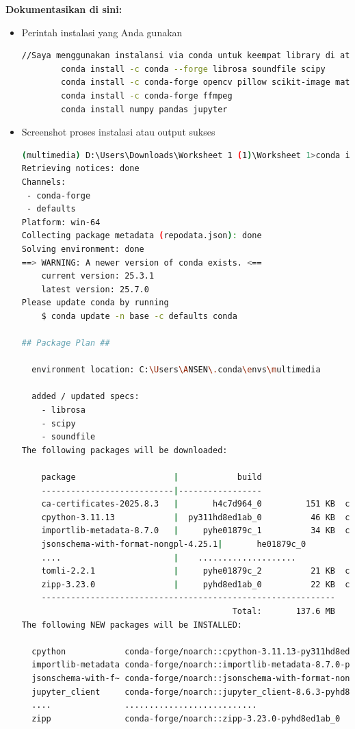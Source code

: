 \documentclass[11pt,a4paper]{article}
\begin{document}
\textbf{Dokumentasikan di sini:}
\begin{itemize}
    \item Perintah instalasi yang Anda gunakan
    \begin{lstlisting}[language=bash, caption=Instalasi library video]
        //Saya menggunakan instalansi via conda untuk keempat library di atas
        conda install -c conda --forge librosa soundfile scipy
        conda install -c conda-forge opencv pillow scikit-image matplotlib
        conda install -c conda-forge ffmpeg
        conda install numpy pandas jupyter
    \end{lstlisting}
    \item Screenshot proses instalasi atau output sukses
    \begin{lstlisting}[language=bash, caption=Output instalansi library]
(multimedia) D:\Users\Downloads\Worksheet 1 (1)\Worksheet 1>conda install -c conda-forge librosa soundfile scipy
Retrieving notices: done
Channels:     
 - conda-forge
 - defaults   
Platform: win-64
Collecting package metadata (repodata.json): done
Solving environment: done
==> WARNING: A newer version of conda exists. <==
    current version: 25.3.1
    latest version: 25.7.0
Please update conda by running
    $ conda update -n base -c defaults conda

## Package Plan ##

  environment location: C:\Users\ANSEN\.conda\envs\multimedia

  added / updated specs:
    - librosa
    - scipy
    - soundfile
The following packages will be downloaded:

    package                    |            build
    ---------------------------|-----------------
    ca-certificates-2025.8.3   |       h4c7d964_0         151 KB  conda-forge
    cpython-3.11.13            |  py311hd8ed1ab_0          46 KB  conda-forge
    importlib-metadata-8.7.0   |     pyhe01879c_1          34 KB  conda-forge
    jsonschema-with-format-nongpl-4.25.1|       he01879c_0           5 KB  conda-forge
    ....                       |    ....................
    tomli-2.2.1                |     pyhe01879c_2          21 KB  conda-forge
    zipp-3.23.0                |     pyhd8ed1ab_0          22 KB  conda-forge
    ------------------------------------------------------------
                                           Total:       137.6 MB
The following NEW packages will be INSTALLED:

  cpython            conda-forge/noarch::cpython-3.11.13-py311hd8ed1ab_0
  importlib-metadata conda-forge/noarch::importlib-metadata-8.7.0-pyhe01879c_1
  jsonschema-with-f~ conda-forge/noarch::jsonschema-with-format-nongpl-4.25.1-he01879c_0
  jupyter_client     conda-forge/noarch::jupyter_client-8.6.3-pyhd8ed1ab_1
  ....               ...........................
  zipp               conda-forge/noarch::zipp-3.23.0-pyhd8ed1ab_0


\end{lstlisting}
\end{itemize}
\end{document}
